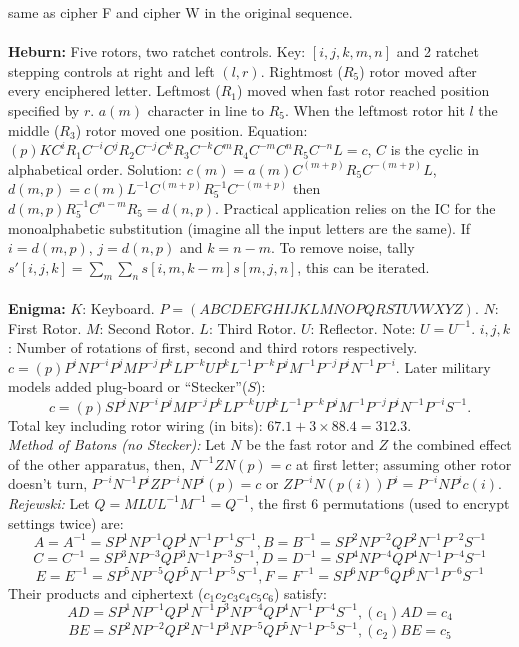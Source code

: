 same as cipher F and cipher W in the original sequence.
\\
\\
{\bf Heburn: } Five rotors, 
two ratchet controls.  Key: $[i,j,k,m,n]$ and 2 ratchet stepping 
controls at right and left $(l, r)$.  Rightmost ($R_5$) rotor moved after
every enciphered 
letter.  Leftmost ($R_1$) moved when fast rotor reached position specified by $r$.  
$a(m)$ character in line to $R_5$.
When the leftmost rotor hit $l$ the middle ($R_3$) rotor moved one position.  Equation:
$(p)K C^iR_1C^{-i} C^j R_2 C^{-j} C^k R_3 C^{-k} C^m R_4 C^{-m} C^n R_5 C^{-n} L=c$,
$C$ is the cyclic in alphabetical order.  Solution: $c(m)= a(m) C^{(m+p)} R_5 C^{-(m+p)}L$,
$d(m,p)= c(m)L^{-1} C^{(m+p)} R_5^{-1} C^{-(m+p)}$ then 
$d(m,p) R_5^{-1} C^{n-m} R_5=d(n,p)$.  Practical application relies on the IC for the
monoalphabetic substitution (imagine all the input letters are the same).  If 
$i=d(m,p)$, $j=d(n,p)$ and $k=n-m$.  To remove noise, tally
$s'[i,j,k]= \sum_m \sum_n s[i, m, k-m] s[m,j,n]$, this can be iterated.
\\
\\
{\bf Enigma: }
$K$: Keyboard.
$P=(ABCDEFGHIJKLMNOPQRSTUVWXYZ)$.
$N$: First Rotor.
$M$: Second Rotor.
$L$: Third Rotor.
$U$: Reflector.  Note: $U=U^{-1}$.
$i,j,k$: Number of rotations of first, second and third rotors respectively.
$c= (p) P^i N P^{-i} P^j M P^{-j} P^k L P^{-k} U P^k L^{-1} P^{-k} P^j M^{-1} P^{-j} P^i N^{-1} P^{-i}$.
Later military models added plug-board or ``Stecker''($S$):
$$c=(p) S P^i N P^{-i} P^jMP^{-j} P^kLP^{-k} U P^kL^{-1}P^{-k} P^jM^{-1}P^{-j} P^iN^{-1}P^{-i}
S^{-1}.$$
Total key including rotor wiring (in bits):
$67.1 + 3 \times 88.4 = 312.3$.
\\
\emph{Method of Batons (no Stecker):} 
Let $N$ be the fast rotor and $Z$ the combined 
effect of the other apparatus, then,
$N^{-1}ZN(p)=c$ 
at first letter; assuming other rotor doesn't turn,
$P^{-i}N^{-1}P^iZP^{-i}NP^i(p)=c$ or
$ZP^{-i}N(p(i))P^i= P^{-i}NP^i c(i)$.  \emph{Rejewski:}
Let $Q= MLUL^{-1}M^{-1}=Q^{-1}$,
the first 6 permutations (used to encrypt settings twice) are:
$$A=A^{-1}= SP^1NP^{-1}QP^1N^{-1}P^{-1}S^{-1}, B=B^{-1}= SP^2NP^{-2}QP^2N^{-1}P^{-2}S^{-1}$$
$$C=C^{-1}= SP^3NP^{-3}QP^3N^{-1}P^{-3}S^{-1}, D=D^{-1}= SP^4NP^{-4}QP^4N^{-1}P^{-4}S^{-1}$$
$$E=E^{-1}= SP^5NP^{-5}QP^5N^{-1}P^{-5}S^{-1}, F=F^{-1}= SP^6NP^{-6}QP^6N^{-1}P^{-6}S^{-1}$$
Their products and ciphertext ($c_1c_2c_3c_4c_5c_6$) satisfy:
$$AD= SP^1NP^{-1}QP^1N^{-1}P^3NP^{-4} QP^4N^{-1}P^{-4} S^{-1}, (c_1)AD= c_4$$
$$BE= SP^2NP^{-2}QP^2N^{-1}P^3NP^{-5}QP^5N^{-1}P^{-5}S^{-1}, (c_2)BE= c_5$$
